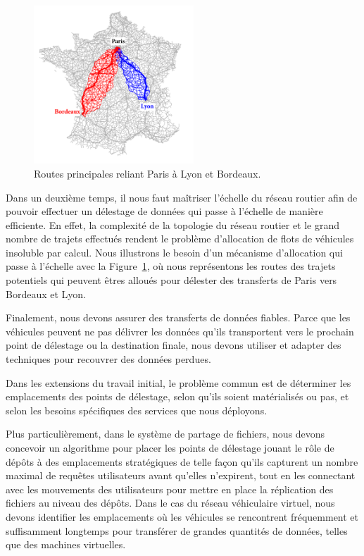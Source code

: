  
\begin{figure} 
    \vspace{-10pt} 
    \centering 
    \includegraphics[width=6cm]{figures-fr/france-roads-2.pdf} 
    \caption{Routes principales reliant Paris à Lyon et Bordeaux.} 
    \label{fig:paris-lyon-fr} 
\end{figure} 
Dans un deuxième temps, il nous faut maîtriser l’échelle du réseau routier afin de pouvoir effectuer un délestage de données qui passe à l’échelle de manière efficiente. En effet, la complexité de la topologie du réseau routier et le grand nombre de trajets effectués rendent le problème d’allocation de flots de véhicules insoluble par calcul. Nous illustrons le besoin d’un mécanisme d’allocation qui passe à l’échelle avec la Figure~\ref{fig:paris-lyon-fr}, où nous représentons les routes des trajets potentiels qui peuvent êtres alloués pour délester des transferts de Paris vers Bordeaux et Lyon. 
 
 
Finalement, nous devons assurer des transferts de données fiables. Parce que les véhicules peuvent ne pas délivrer les données qu’ils transportent vers le prochain point de délestage ou la destination finale, nous devons utiliser et adapter des techniques pour recouvrer des données perdues. 
 
 
Dans les extensions du travail initial, le problème commun est de déterminer les emplacements des points de délestage, selon qu’ils soient matérialisés ou pas, et selon les besoins spécifiques des services que nous déployons. 
 
Plus particulièrement, dans le système de partage de fichiers, nous devons concevoir un algorithme pour placer les points de délestage jouant le rôle de dépôts à des emplacements stratégiques de telle façon qu’ils capturent un nombre maximal de requêtes utilisateurs avant qu’elles n’expirent, tout en les connectant avec les mouvements des utilisateurs pour mettre en place la réplication des fichiers au niveau des dépôts. Dans le cas du réseau véhiculaire virtuel, nous devons identifier les emplacements où les véhicules se rencontrent fréquemment et suffisamment longtemps pour transférer de grandes quantités de données, telles que des machines virtuelles. 
 
